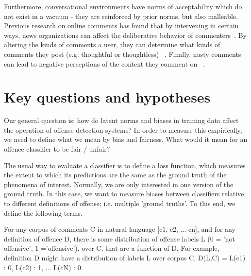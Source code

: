 \documentclass[runningheads,a4paper]{llncs}
\begin{document}
Furthermore, conversational environments have norms of acceptability which do not exist in a vacuum - they are reinforced by prior norms, but also malleable. Previous research on online comments has found that by intervening in certain ways, news organizations can affect the deliberative behavior of commenters~\cite{stroud2015changing}. By altering the kinds of comments a user, they can determine what kinds of comments they post (e.g. thoughtful or thoughtless) ~\cite{sukumaran2011normative}. Finally, nasty comments can lead to negative perceptions of the content they comment on ~\cite{anderson2014nasty}.


\section{Key questions and hypotheses}



Our general question is: how do latent norms and biases in training data affect the operation of offense detection systems? In order to measure this empirically, we need to define what we mean by bias and fairness. What would it mean for an offence classifier to be fair / unfair?

The usual way to evaluate a classifier is to define a loss function, which measures the extent to which its predictions are the same as the ground truth of the phenomena of interest. Normally, we are only interested in one version of the ground truth. In this case, we want to measure biases between classifiers relative to different definitions of offense; i.e. multiple 'ground truths'. To this end, we define the following terms.

For any corpus of comments C in natural language [c1, c2, ... cn], and for any definition of offence D, there is some distribution of offense labels L (0 = 'not offensive', 1 ='offensive'), over C, that are a function of D. For example, definition D might have a distribution of labels L over corpus C, D(L,C) = {L(c1) : 0, L(c2) : 1, ... L(cN) : 0}.
\end{document}
